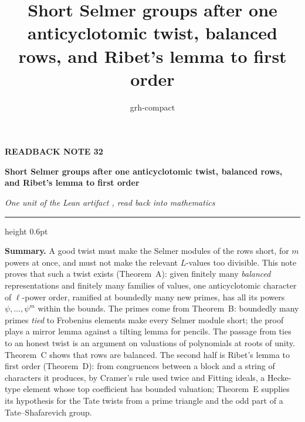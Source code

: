 \documentclass[11pt,a4paper]{article}
\title{Short Selmer groups after one anticyclotomic twist, balanced rows, and Ribet's lemma to first order}
\author{grh-compact}
\date{}
\newcommand{\m}[1]{\mbox{$#1$}}        %
\theoremstyle{plainx}
\theoremstyle{uprightx}
\begin{document}
\color{ink}

{\raggedright
{\sffamily\bfseries\fontsize{7.2}{9}\selectfont\color{leancol}READBACK NOTE 32\par}
\vspace{5pt}
{\fontsize{21.5}{25.5}\selectfont\bfseries Short Selmer groups after one anticyclotomic twist, balanced rows, and Ribet's lemma to first order\par}
\vspace{5pt}
{\fontsize{12.4}{16}\selectfont\itshape\color{inksoft} One unit of the Lean artifact \ArtifactName, read back into
mathematics\par}}
\vspace{8pt}
{\color{rulegrey}\hrule height 0.6pt}
\vspace{7pt}
\thispagestyle{empty}

\textbf{Summary.} A good twist must make the Selmer modules of the rows short, for $m$ powers at once, and must
not make the relevant $L$-values too divisible. This note proves that such a twist exists (Theorem~A): given
finitely many \emph{balanced} representations and finitely many families of values, one anticyclotomic character
of $\ell$-power order, ramified at boundedly many new primes, has all its powers \m{\psi,\dots,\psi^{m}} within the
bounds. The primes come from Theorem~B: boundedly many primes \emph{tied} to Frobenius elements make every
Selmer module short; the proof plays a mirror lemma against a tilting lemma for pencils. The passage from ties to
an honest twist is an argument on valuations of polynomials at roots of unity. Theorem~C shows that rows are
balanced. The second half is Ribet's lemma to first order (Theorem~D): from congruences between a block and a
string of characters it produces, by Cramer's rule used twice and Fitting ideals, a Hecke-type element whose top
coefficient has bounded valuation; Theorem~E supplies its hypothesis for the Tate twists from a prime triangle
and the odd part of a Tate--Shafarevich group.
\end{document}
